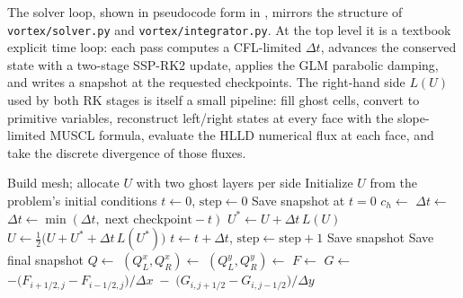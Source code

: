 \documentclass[11pt]{article}
\begin{document}
The solver loop, shown in pseudocode form in , mirrors the structure of \texttt{vortex/solver.py} and \texttt{vortex/integrator.py}.  At the top level it is a textbook explicit time loop: each pass computes a CFL-limited $\Delta t$, advances the conserved state with a two-stage SSP-RK2 update, applies the GLM parabolic damping, and writes a snapshot at the requested checkpoints.  The right-hand side $L(U)$ used by both RK stages is itself a small pipeline: fill ghost cells, convert to primitive variables, reconstruct left/right states at every face with the slope-limited MUSCL formula, evaluate the HLLD numerical flux at each face, and take the discrete divergence of those fluxes.

\begin{algorithm}[H]
\caption{Top-level 2D ideal MHD solver.}
\label{alg:solver}
\begin{algorithmic}[1]
  \State Build mesh; allocate $U$ with two ghost layers per side
  \State Initialize $U$ from the problem's initial conditions
  \State $t \gets 0$,\; $\text{step} \gets 0$
  \State Save snapshot at $t = 0$
    \State $c_h \gets$ 
    \State $\Delta t \gets$  
    \State $\Delta t \gets \min(\Delta t,\;\text{next checkpoint} - t)$
    \State $U^{*} \gets U + \Delta t\,L(U)$ 
    \State $U \gets \tfrac{1}{2}\bigl(U + U^{*} + \Delta t\,L(U^{*})\bigr)$ 
    \State {} 
    \State $t \gets t + \Delta t$,\; $\text{step} \gets \text{step}+1$
      \State Save snapshot
    \EndIf
  \EndWhile
  \State Save final snapshot
\EndProcedure
\Statex
{} 
  \State {} 
  \State $Q \gets$ 
  \State $(Q_L^x, Q_R^x) \gets$  
  \State $(Q_L^y, Q_R^y) \gets$ 
  \State $F \gets$  
  \State $G \gets$ 
  \State \Return $-\bigl(F_{i+1/2,j} - F_{i-1/2,j}\bigr)/\Delta x \;-\; \bigl(G_{i,j+1/2} - G_{i,j-1/2}\bigr)/\Delta y$
\EndFunction
\Statex
{}

\end{algorithmic}
\end{algorithm}
\end{document}
